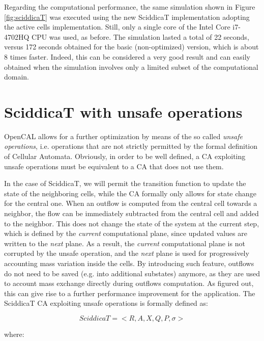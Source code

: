Regarding the computational performance, the same simulation shown in
Figure \ref{fig:sciddicaT} was executed using the new SciddicaT
implementation adopting the active cells implementation. Still, only a
single core of the Intel Core i7-4702HQ CPU was used, as before. The
simulation lasted a total of 22 seconds, versus 172 seconds obtained
for the basic (non-optimized) version, which is about 8 times
faster. Indeed, this can be considered a very good result and can
easily obtained when the simulation involves only a limited subset of
the computational domain.

\section{SciddicaT with unsafe operations}\label{sec:sciddicaT_extended}
OpenCAL allows for a further optimization by means of the so called
\emph{unsafe operations}, i.e. operations that are not strictly
permitted by the formal definition of Cellular Automata. Obviously, in
order to be well defined, a CA exploiting unsafe operations must be
equivalent to a CA that does not use them.

In the case of SciddicaT, we will permit the transition function to
update the state of the neighboring cells, while the CA formally only
allows for state change for the central one. When an outflow is
computed from the central cell towards a neighbor, the flow can be
immediately subtracted from the central cell and added to the
neighbor. This does not change the state of the system at the current
step, which is defined by the \emph{current} computational plane,
since updated values are written to the \emph{next} plane. As a
result, the \emph{current} computational plane is not corrupted by the
unsafe operation, and the \emph{next} plane is used for progressively
accounting mass variation inside the cells. By introducing such
feature, outflows do not need to be saved (e.g. into additional
substates) anymore, as they are used to account mass exchange directly
during outflows computation. As figured out, this can give rise to a
further performance improvement for the application. The SciddicaT CA
exploiting unsafe operations is formally defined as:


$$SciddicaT = < R, A, X, Q , P, \sigma  >$$

where:

